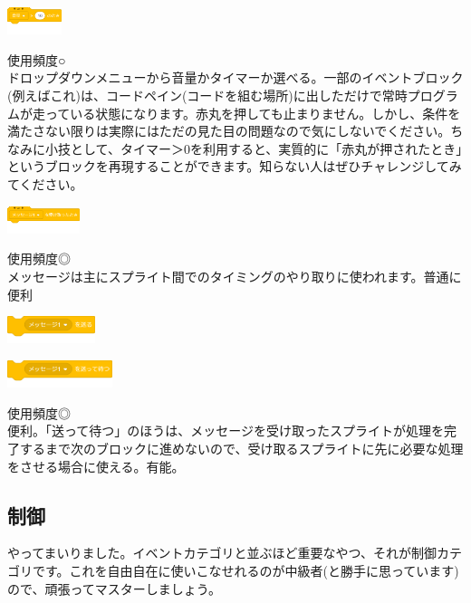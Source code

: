 \documentclass[b5paper,10pt]{jsarticle}
\begin{document}
\begin{multicols*}{3}
\begin{itembox}{5}
\includegraphics[height=8mm]{images/events_5.png}
\end{itembox}
使用頻度○\\
ドロップダウンメニューから音量かタイマーか選べる。一部のイベントブロック(例えばこれ)は、コードペイン(コードを組む場所)に出しただけで常時プログラムが走っている状態になります。赤丸を押しても止まりません。しかし、条件を満たさない限りは実際にはただの見た目の問題なので気にしないでください。ちなみに小技として、タイマー＞0を利用すると、実質的に「赤丸が押されたとき」というブロックを再現することができます。知らない人はぜひチャレンジしてみてください。
\begin{itembox}{6}
\includegraphics[height=8mm]{images/events_6.png}
\end{itembox}
使用頻度◎\\
メッセージは主にスプライト間でのタイミングのやり取りに使われます。普通に便利
\begin{itembox}{7}
\includegraphics[height=8mm]{images/events_7.png}

\includegraphics[height=8mm]{images/events_8.png}
\end{itembox}
使用頻度◎\\
便利。「送って待つ」のほうは、メッセージを受け取ったスプライトが処理を完了するまで次のブロックに進めないので、受け取るスプライトに先に必要な処理をさせる場合に使える。有能。

\subsection{制御}
やってまいりました。イベントカテゴリと並ぶほど重要なやつ、それが制御カテゴリです。これを自由自在に使いこなせれるのが中級者(と勝手に思っています)ので、頑張ってマスターしましょう。


\end{multicols*}
\end{document}
